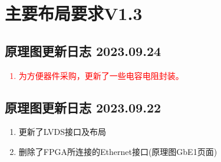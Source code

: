 
\chapter*{主要布局要求V1.3}
\section*{原理图更新日志 2023.09.24}
\textcolor{red}{
\begin{enumerate}
  \item 为方便器件采购，更新了一些电容电阻封装。
\end{enumerate}
}
\section*{原理图更新日志 2023.09.22}
\begin{enumerate}
  \item 更新了LVDS接口及布局
  \item 删除了FPGA所连接的Ethernet接口(原理图GbE1页面)
\end{enumerate}

